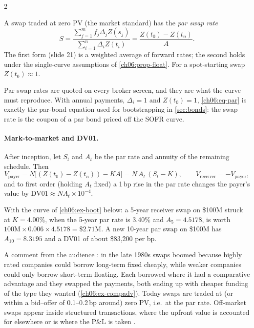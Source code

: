 \begin{paracol}{2}
\begin{corollary}\label{ch06:cor-par}
A swap traded at zero PV (the market standard) has the \emph{par swap rate} 
\begin{equation}\label{ch06:eq-par}
  S=\frac{\sum_{j=1}^mf_j\Delta_jZ(s_j)}{\sum_{i=1}^n\Delta_iZ(t_i)}
   =\frac{Z(t_0)-Z(t_n)}{A}.
\end{equation}
The first form (slide 21) is a weighted average of forward rates; the second holds under the single-curve
assumptions of \cref{ch06:prop-float}. For a spot-starting swap $Z(t_0)\approx1$.
\end{corollary}
Par swap rates are quoted on every broker screen, and they are what the curve must reproduce. With annual
payments, $\Delta_i=1$ and $Z(t_0)=1$, \eqref{ch06:eq-par} is exactly the par-bond equation used for
bootstrapping in \cref{sec:bonds}: the swap rate is the coupon of a par bond priced off the SOFR curve.

\paragraph{Mark-to-market and DV01.} After inception, let $S_t$ and $A_t$ be the par rate and annuity of the
remaining schedule. Then
\begin{equation}\label{ch06:eq-mtm}
  V_{\mathrm{payer}}=N\bigl[(Z(t_0)-Z(t_n))-KA\bigr]=N\,A_t\,(S_t-K),\qquad V_{\mathrm{receiver}}=-V_{\mathrm{payer}},
\end{equation}
and to first order (holding $A_t$ fixed) a 1\,bp rise in the par rate changes the payer's value by
$\mathrm{DV01}\approx N A_t\times10^{-4}$.

\begin{example}
With the curve of \cref{ch06:ex-boot} below: a 5-year receiver swap on \$100M struck at $K=4.00\%$, when the
5-year par rate is $3.40\%$ and $A_5=4.5178$, is worth $100\text{M}\times0.006\times4.5178=\$2.71$M. A new
10-year par swap on \$100M has $A_{10}=8.3195$ and a DV01 of about \$83{,}200 per bp.
\end{example}

\begin{finance}
A comment from the audience : in the late 1980s swaps boomed because highly rated companies
could borrow long-term fixed cheaply, while weaker companies could only borrow short-term floating. Each borrowed
where it had a comparative advantage and they swapped the payments, both ending up with cheaper funding of the
type they wanted  (\cref{ch06:ex-compadv}). Today swaps are traded at (or within a bid--offer of
0.1--0.2\,bp around) zero PV, i.e.\ at the par rate. Off-market swaps appear inside structured transactions,
where the upfront value is accounted for elsewhere or is where the P\&L is taken .
\end{finance}


\end{paracol}
